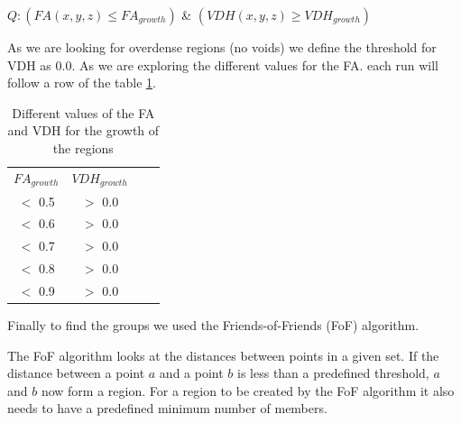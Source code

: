 \documentclass[12pt]{article}
\begin{document}
\begin{itemize}
\begin{par}
\begin{center}
$Q: \left( FA (x,y,z) \leq FA_{growth} \right)$ \&
$\left( VDH (x,y,z) \geq VDH_{growth} \right)$ 
\end{center}
As we are looking for overdense regions (no voids) we define the
threshold for VDH as 0.0. As we are exploring the different
values for the FA. each run will follow a row of the table \ref{tab:search_FA_Trace}.
\end{par}

\begin{table}[ht]
    \centering
    \begin{tabular}{|c|c|c|c|}
        $FA_{growth}$ & $VDH_{growth}$ \\
        $<$ 0.5 &  $>$ 0.0 \\
        $<$ 0.6 &  $>$ 0.0 \\
        $<$ 0.7 &  $>$ 0.0 \\
        $<$ 0.8 &  $>$ 0.0 \\
        $<$ 0.9 &  $>$ 0.0 \\
    \end{tabular}
    \caption{Different values of the FA and VDH for the growth of the regions}
    \label{tab:search_FA_Trace}
\end{table}
\FloatBarrier

\end{itemize}



\begin{par}
Finally to find the groups we used the Friends-of-Friends (FoF) algorithm.
\end{par}

\begin{par}
The FoF algorithm looks at the distances between points in a given
set. If the distance between a point $a$ and a point $b$ is less
than a predefined threshold, $a$ and $b$ now form a region. For a
region to be created by the FoF algorithm it also needs to have a
predefined minimum number of members. 
\end{par}
\end{document}
